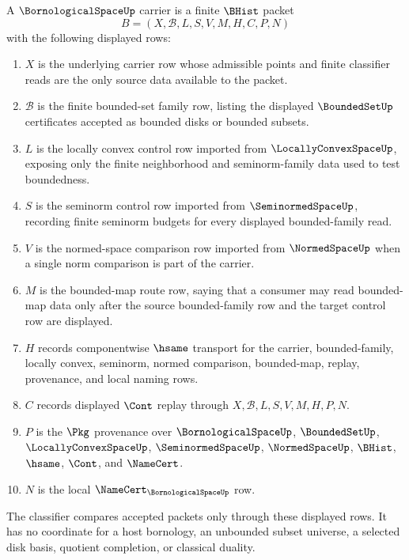 \begin{definition}
\label{def:bornological-space-carrier}
A $\BornologicalSpaceUp$ carrier is a finite $\BHist$ packet
$$
B=(X,\mathcal{B},L,S,V,M,H,C,P,N)
$$
with the following displayed rows:
\begin{enumerate}
\item $X$ is the underlying carrier row whose admissible points and finite classifier reads are the only source data available to the packet.
\item $\mathcal{B}$ is the finite bounded-set family row, listing the displayed $\BoundedSetUp$ certificates accepted as bounded disks or bounded subsets.
\item $L$ is the locally convex control row imported from $\LocallyConvexSpaceUp$, exposing only the finite neighborhood and seminorm-family data used to test boundedness.
\item $S$ is the seminorm control row imported from $\SeminormedSpaceUp$, recording finite seminorm budgets for every displayed bounded-family read.
\item $V$ is the normed-space comparison row imported from $\NormedSpaceUp$ when a single norm comparison is part of the carrier.
\item $M$ is the bounded-map route row, saying that a consumer may read bounded-map data only after the source bounded-family row and the target control row are displayed.
\item $H$ records componentwise $\hsame$ transport for the carrier, bounded-family, locally convex, seminorm, normed comparison, bounded-map, replay, provenance, and local naming rows.
\item $C$ records displayed $\Cont$ replay through $X,\mathcal{B},L,S,V,M,H,P,N$.
\item $P$ is the $\Pkg$ provenance over $\BornologicalSpaceUp$, $\BoundedSetUp$, $\LocallyConvexSpaceUp$, $\SeminormedSpaceUp$, $\NormedSpaceUp$, $\BHist$, $\hsame$, $\Cont$, and $\NameCert$.
\item $N$ is the local $\NameCert_{\BornologicalSpaceUp}$ row.
\end{enumerate}
The classifier compares accepted packets only through these displayed rows. It has no coordinate for a host bornology, an unbounded subset universe, a selected disk basis, quotient completion, or classical duality.
\end{definition}

